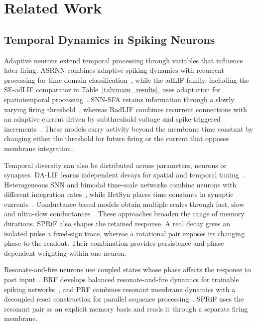 \documentclass[letterpaper,journal]{IEEEtran}
\begin{document}
\section{Related Work}
\label{sec:related}

\subsection{Temporal Dynamics in Spiking Neurons}

Adaptive neurons extend temporal processing through variables that influence later firing. ASRNN combines adaptive spiking dynamics with recurrent processing for time-domain classification~\cite{asrnn}, while the adLIF family, including the SE-adLIF comparator in Table~\ref{tab:main_results}, uses adaptation for spatiotemporal processing~\cite{adlif}. SNN-SFA retains information through a slowly varying firing threshold~\cite{snnsfa}, whereas RadLIF combines recurrent connections with an adaptive current driven by subthreshold voltage and spike-triggered increments~\cite{radlif}. These models carry activity beyond the membrane time constant by changing either the threshold for future firing or the current that opposes membrane integration.

Temporal diversity can also be distributed across parameters, neurons or synapses. DA-LIF learns independent decays for spatial and temporal tuning~\cite{dalif}. Heterogeneous SNN and bimodal time-scale networks combine neurons with different integration rates~\cite{heterogeneity,bimodal}, while HetSyn places time constants in synaptic currents~\cite{hetsyn}. Conductance-based models obtain multiple scales through fast, slow and ultra-slow conductances~\cite{mtc}. These approaches broaden the range of memory durations. SPRiF also shapes the retained response. A real decay gives an isolated pulse a fixed-sign trace, whereas a rotational pair exposes its changing phase to the readout. Their combination provides persistence and phase-dependent weighting within one neuron.

Resonate-and-fire neurons use coupled states whose phase affects the response to past input~\cite{izhikevich_rf}. BRF develops balanced resonate-and-fire dynamics for trainable spiking networks~\cite{brf}, and PRF combines resonant membrane dynamics with a decoupled reset construction for parallel sequence processing~\cite{prf}. SPRiF uses the resonant pair as an explicit memory basis and reads it through a separate firing membrane.
\end{document}
